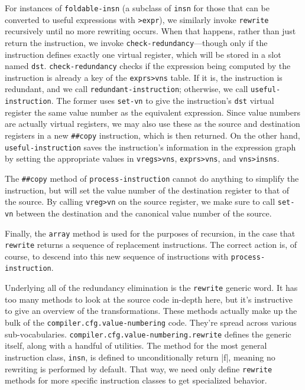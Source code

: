 
For instances of \Verb|foldable-insn| (a subclass of \Verb|insn| for those that
can be converted to useful expressions with \Verb|>expr|), we similarly invoke
\Verb|rewrite| recursively until no more rewriting occurs.  When that happens,
rather than just return the instruction, we invoke
\Verb|check-redundancy|---though only if the instruction defines exactly one
virtual register, which will be stored in a slot named \Verb|dst|.
\Verb|check-redundancy| checks if the expression being computed by the
instruction is already a key of the \Verb|exprs>vns| table.  If it is, the
instruction is redundant, and we call \Verb|redundant-instruction|; otherwise,
we call \Verb|useful-instruction|.  The former uses \Verb|set-vn| to give the
instruction's \Verb|dst| virtual register the same value number as the
equivalent expression.  Since value numbers are actually virtual registers, we
may also use these as the source and destination registers in a new
\Verb|##copy| instruction, which is then returned.  On the other hand,
\Verb|useful-instruction| saves the instruction's information in the expression
graph by setting the appropriate values in \Verb|vregs>vns|, \Verb|exprs>vns|,
and \Verb|vns>insns|.

The \Verb|##copy| method of \Verb|process-instruction| cannot do anything
to simplify the instruction, but will set the value number of the destination
register to that of the source.  By calling \Verb|vreg>vn| on the source
register, we make sure to call \Verb|set-vn| between the destination and the
canonical value number of the source.

Finally, the \Verb|array| method is used for the purposes of recursion, in
the case that \Verb|rewrite| returns a sequence of replacement instructions.
The correct action is, of course, to descend into this new sequence of
instructions with \Verb|process-instruction|.

Underlying all of the redundancy elimination is the \Verb|rewrite| generic
word.  It has too many methods to look at the source code in-depth here, but
it's instructive to give an overview of the transformations.  These methods
actually make up the bulk of the \Verb|compiler.cfg.value-numbering| code.
They're spread across various sub-vocabularies.
\Verb|compiler.cfg.value-numbering.rewrite| defines the generic itself, along
with a handful of utilities.  The method for the most general instruction
class, \Verb|insn|, is defined to unconditionally return \factor|f|, meaning no
rewriting is performed by default.  That way, we need only define
\Verb|rewrite| methods for more specific instruction classes to get specialized
behavior.


